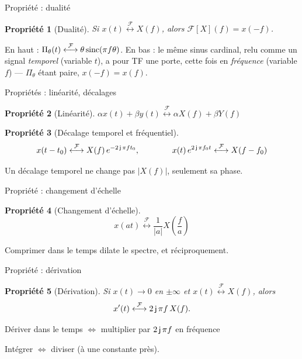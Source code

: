\documentclass[aspectratio=43,10pt]{beamer}
\newtheorem{proposition}{Propriété}
\newcommand{\highlight}[1]{{\color{niceblue}\emph{#1}}}
\newcommand{\tf}{\overset{\mathcal F}{\longleftrightarrow}}
\newcommand{\slidefig}[2]{%
\begin{center}
\resizebox{#1}{!}{}
\end{center}
}
\begin{document}
\begin{frame}{Propriété : dualité}
    \begin{proposition}[Dualité]
        Si $x(t)\tf X(f)$, alors $\mathcal F[X](f) = x(-f)$.
    \end{proposition}
    \slidefig{0.85\textwidth}{dualite-2x2.tex}
    \begin{center}
        \small En haut : $\Pi_\theta(t)\tf\theta\sinc(\pi f\theta)$. En
        bas : le même sinus cardinal, relu comme un signal
        \highlight{temporel} (variable $t$), a pour TF une porte, cette
        fois en \highlight{fréquence} (variable $f$) --- $\Pi_\theta$
        étant paire, $x(-f)=x(f)$.
    \end{center}
\end{frame}

\begin{frame}{Propriétés : linéarité, décalages}
    \begin{proposition}[Linéarité]
        $\alpha x(t) + \beta y(t) \tf \alpha X(f) + \beta Y(f)$
    \end{proposition}
    \begin{proposition}[Décalage temporel et fréquentiel]
        $$
            x(t-t_0) \tf X(f)\,e^{-2\complexj\pi ft_0}, \qquad\qquad
            x(t)\,e^{2\complexj\pi f_0t} \tf X(f-f_0)
        $$
    \end{proposition}
    \begin{center}
        \small Un décalage temporel ne change pas $|X(f)|$, seulement
        sa phase.
    \end{center}
\end{frame}

\begin{frame}{Propriété : changement d'échelle}
    \begin{proposition}[Changement d'échelle]
        $$
            x(at) \tf \frac{1}{|a|}X\!\left(\frac fa\right)
        $$
    \end{proposition}
    \slidefig{0.7\textwidth}{echelle-small-theta.tex}
    \slidefig{0.7\textwidth}{echelle-large-theta.tex}
    \begin{center}
        \small
        Comprimer dans le temps dilate le spectre, et réciproquement.
    \end{center}
\end{frame}

\begin{frame}{Propriété : dérivation}
    \begin{proposition}[Dérivation]
        Si $x(t)\to0$ en $\pm\infty$ et $x(t)\tf X(f)$, alors
        $$
            x'(t) \tf 2\complexj\pi f\,X(f).
        $$
    \end{proposition}
    \begin{center}
        \small Dériver dans le temps $\iff$ multiplier par
        $2\operatorname{\mathsf{j}}\pi f$ en fréquence
        
        Intégrer $\iff$ diviser (à
        une constante près).
    \end{center}
\end{frame}
\end{document}
